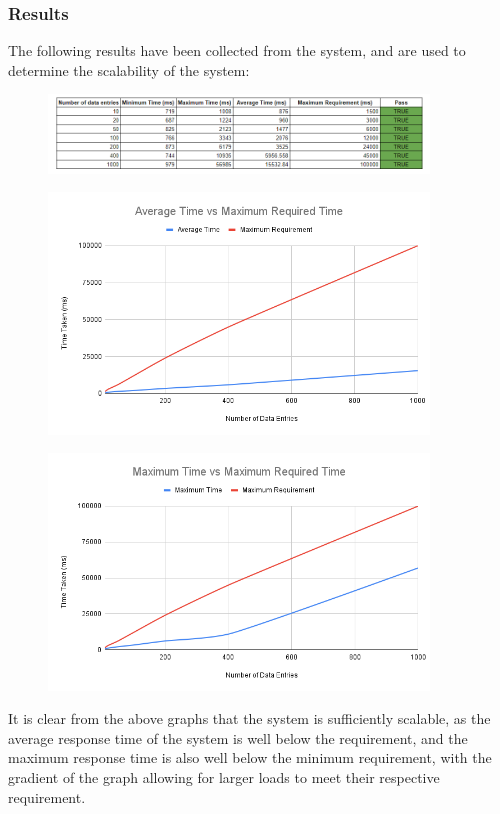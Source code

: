 \documentclass[12pt]{article}
\begin{document}
\subsubsection{Results}
The following results have been collected from the system, and are used to determine the scalability of the system:
\begin{figure}[H]
    \centering
    \includegraphics[width=0.9\textwidth]{Scalability.png}
\end{figure}
\begin{figure}[H]
    \centering
    \includegraphics[width=0.9\textwidth]{Average Time vs Maximum Required Time.png}
\end{figure}
\begin{figure}[H]
    \centering
    \includegraphics[width=0.9\textwidth]{Maximum Time vs Maximum Required Time.png}
\end{figure}
It is clear from the above graphs that the system is sufficiently scalable, as the average response time of the system is well below the requirement, and the maximum response time is also well below the minimum requirement, with the gradient of the graph allowing for larger loads to meet their respective requirement.
\end{document}
